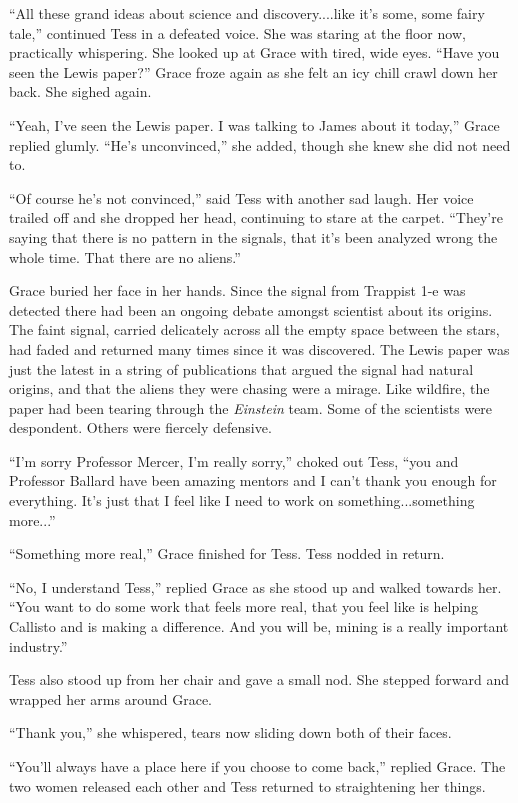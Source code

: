 \documentclass[12pt]{article} %
\begin{document}
``All these grand ideas about science and discovery....like it's some, some fairy tale,'' continued Tess in a defeated voice. She was staring at the floor now, practically whispering. She looked up at Grace with tired, wide eyes. ``Have you seen the Lewis paper?'' Grace froze again as she felt an icy chill crawl down her back. She sighed again.

``Yeah, I've seen the Lewis paper. I was talking to James about it today,'' Grace replied glumly. ``He's unconvinced,'' she added, though she knew she did not need to.

``Of course he's not convinced,'' said Tess with another sad laugh. Her voice trailed off and she dropped her head, continuing to stare at the carpet. ``They're saying that there is no pattern in the signals, that it's been analyzed wrong the whole time. That there are no aliens.'' 

Grace buried her face in her hands. Since the signal from Trappist 1-e was detected there had been an ongoing debate amongst scientist about its origins. The faint signal, carried delicately across all the empty space between the stars, had faded and returned many times since it was discovered. The Lewis paper was just the latest in a string of publications that argued the signal had natural origins, and that the aliens they were chasing were a mirage. Like wildfire, the paper had been tearing through the \textit{Einstein} team. Some of the scientists were despondent. Others were fiercely defensive.

``I'm sorry Professor Mercer, I'm really sorry,'' choked out Tess, ``you and Professor Ballard have been amazing mentors and I can't thank you enough for everything. It's just that I feel like I need to work on something...something more...''

``Something more real,'' Grace finished for Tess. Tess nodded in return.

``No, I understand Tess,'' replied Grace as she stood up and walked towards her. ``You want to do some work that feels more real, that you feel like is helping Callisto and is making a difference. And you will be, mining is a really important industry.''

Tess also stood up from her chair and gave a small nod. She stepped forward and wrapped her arms around Grace.

``Thank you,'' she whispered, tears now sliding down both of their faces.

``You'll always have a place here if you choose to come back,'' replied Grace. The two women released each other and Tess returned to straightening her things. 
\end{document}
